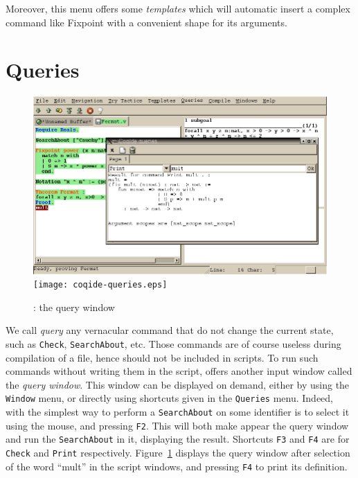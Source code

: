Moreover, this menu offers some \emph{templates} which will automatic
insert a complex command like Fixpoint with a convenient shape for its
arguments. 

\section{Queries}

\begin{figure}[t]
\begin{center}
\ifpdf  %
\includegraphics[width=1.0\textwidth]{coqide-queries.png}
\else
\texttt{[image: coqide-queries.eps]}
\fi
\end{center}
\caption{\CoqIDE{}: the query window}
\label{fig:querywindow}
\end{figure}


We call \emph{query} any vernacular command that do not change the
current state, such as \verb|Check|, \verb|SearchAbout|, etc. Those
commands are of course useless during compilation of a file, hence
should not be included in scripts. To run such commands without
writing them in the script, \CoqIDE{} offers another input window
called the \emph{query window}. This window can be displayed on
demand, either by using the \texttt{Window} menu, or directly using
shortcuts given in the \texttt{Queries} menu. Indeed, with \CoqIDE{}
the simplest way to perform a \texttt{SearchAbout} on some identifier
is to select it using the mouse, and pressing \verb|F2|. This will
both make appear the query window and run the \texttt{SearchAbout} in
it, displaying the result. Shortcuts \verb|F3| and \verb|F4| are for
\verb|Check| and \verb|Print| respectively.
Figure~\ref{fig:querywindow} displays the query window after selection
of the word ``mult'' in the script windows, and pressing \verb|F4| to
print its definition.


